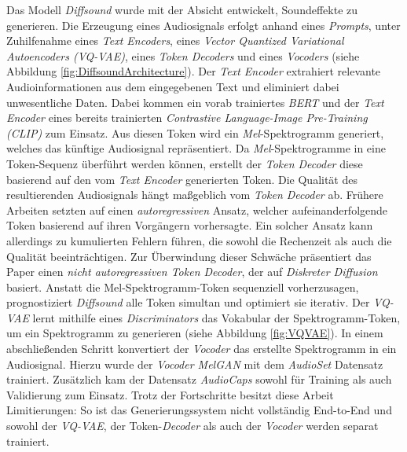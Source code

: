 \documentclass[
  a4paper,  %
  twoside,  %
  bibliography=totoc,
  headsepline,
  cleardoublepage=empty,
  parskip=half,
  draft=false
]{scrbook}
\begin{document}
Das Modell \emph{Diffsound} \cite{yang_diffsound_2023} wurde mit der Absicht entwickelt, Soundeffekte zu generieren. Die Erzeugung eines Audiosignals erfolgt anhand eines \emph{Prompts}, unter Zuhilfenahme eines \emph{Text Encoders}, eines \emph{Vector Quantized Variational Autoencoders (\emph{VQ-VAE})}, eines \emph{Token Decoders} und eines \emph{Vocoders} (siehe Abbildung \ref{fig:DiffsoundArchitecture}). Der \emph{Text Encoder} extrahiert relevante Audioinformationen aus dem eingegebenen Text und eliminiert dabei unwesentliche Daten. Dabei kommen ein vorab trainiertes \emph{BERT} \cite{devlin_bert_2019} und der \emph{Text Encoder} eines bereits trainierten \emph{Contrastive Language-Image Pre-Training (CLIP)} \cite{radford_learning_2021} zum Einsatz. Aus diesen Token wird ein \emph{Mel}-Spektrogramm generiert, welches das künftige Audiosignal repräsentiert. Da \emph{Mel}-Spektrogramme in eine Token-Sequenz überführt werden können, erstellt der \emph{Token Decoder} diese basierend auf den vom \emph{Text Encoder} generierten Token. Die Qualität des resultierenden Audiosignals hängt maßgeblich vom \emph{Token Decoder} ab. Frühere Arbeiten \cite{liu_conditional_2021, iashin_taming_2021} setzten auf einen \emph{autoregressiven} Ansatz, welcher aufeinanderfolgende Token basierend auf ihren Vorgängern vorhersagte. Ein solcher Ansatz kann allerdings zu kumulierten Fehlern führen, die sowohl die Rechenzeit als auch die Qualität beeinträchtigen. Zur Überwindung dieser Schwäche präsentiert das Paper einen \emph{nicht autoregressiven Token Decoder}, der auf \emph{Diskreter Diffusion} \cite{sohl-dickstein_deep_2015, austin_structured_2023} basiert. Anstatt die Mel-Spektrogramm-Token sequenziell vorherzusagen, prognostiziert \emph{Diffsound} alle Token simultan und optimiert sie iterativ. Der \emph{VQ-VAE} \cite{oord_neural_2018} lernt mithilfe eines \emph{Discriminators} das Vokabular der Spektrogramm-Token, um ein Spektrogramm zu generieren (siehe Abbildung \ref{fig:VQVAE}). In einem abschließenden Schritt konvertiert der \emph{Vocoder} das erstellte Spektrogramm in ein Audiosignal. Hierzu wurde der \emph{Vocoder MelGAN} \cite{kumar_melgan_2019} mit dem \emph{AudioSet} \cite{gemmeke_audio_2017} Datensatz trainiert. Zusätzlich kam der Datensatz \emph{AudioCaps} \cite{kim_audiocaps_2019} sowohl für Training als auch Validierung zum Einsatz. Trotz der Fortschritte besitzt diese Arbeit Limitierungen: So ist das Generierungssystem nicht vollständig End-to-End und sowohl der \emph{VQ-VAE}, der Token-\emph{Decoder} als auch der \emph{Vocoder} werden separat trainiert. \cite{yang_diffsound_2023}
\end{document}
